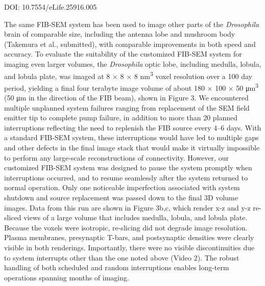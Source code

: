 \documentclass{article}
\begin{document}
\noindent DOI: 10.7554/eLife.25916.005

The same FIB-SEM system has been used to image other parts of the \emph{Drosophila} brain of comparable size, including the antenna lobe and mushroom body (Takemura et al., submitted), with comparable improvements in both speed and accuracy. To evaluate the suitability of the customized FIB-SEM system for imaging even larger volumes, the \emph{Drosophila} optic lobe, including medulla, lobula, and lobula plate, was imaged at 8 × 8 × 8 nm\textsuperscript{3} voxel resolution over a 100 day period, yielding a final four terabyte image volume of about 180 × 100 × 50 μm\textsuperscript{3} (50 μm in the direction of the FIB beam), shown in Figure 3. We encountered multiple unplanned system failures ranging from replacement of the SEM field emitter tip to complete pump failure, in addition to more than 20 planned interruptions reflecting the need to replenish the FIB source every 4–6 days. With a standard FIB-SEM system, these interruptions would have led to multiple gaps and other defects in the final image stack that would make it virtually impossible to perform any large-scale reconstructions of connectivity. However, our customized FIB-SEM system was designed to pause the system promptly when interruptions occurred, and to resume seamlessly after the system returned to normal operation. Only one noticeable imperfection associated with system shutdown and source replacement was passed down to the final 3D volume images. Data from this run are shown in Figure 3b,c, which render x-z and y-z re-sliced views of a large volume that includes medulla, lobula, and lobula plate. Because the voxels were isotropic, re-slicing did not degrade image resolution. Plasma membranes, presynaptic T-bars, and postsynaptic densities were clearly visible in both renderings. Importantly, there were no visible discontinuities due to system interrupts other than the one noted above (Video 2). The robust handling of both scheduled and random interruptions enables long-term operations spanning months of imaging.
\end{document}
